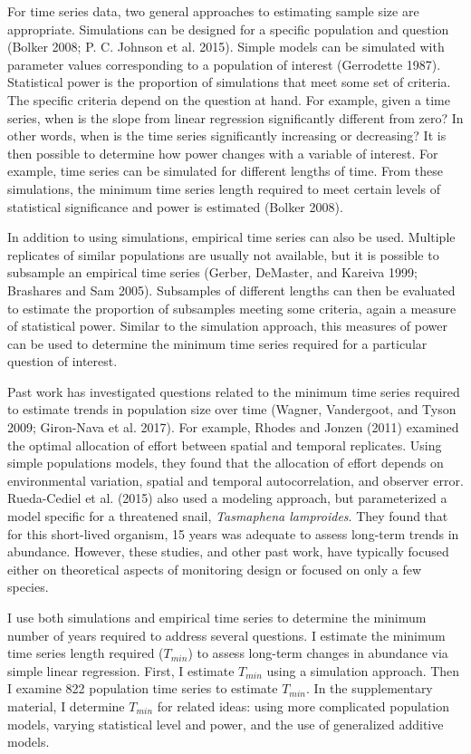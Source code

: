 \documentclass[12pt,]{article}
\begin{document}
\begin{spacing}{2}
For time series data, two general approaches to estimating sample size
are appropriate. Simulations can be designed for a specific population
and question (Bolker 2008; P. C. Johnson et al. 2015). Simple models can
be simulated with parameter values corresponding to a population of
interest (Gerrodette 1987). Statistical power is the proportion of
simulations that meet some set of criteria. The specific criteria depend
on the question at hand. For example, given a time series, when is the
slope from linear regression significantly different from zero? In other
words, when is the time series significantly increasing or decreasing?
It is then possible to determine how power changes with a variable of
interest. For example, time series can be simulated for different
lengths of time. From these simulations, the minimum time series length
required to meet certain levels of statistical significance and power is
estimated (Bolker 2008).

In addition to using simulations, empirical time series can also be
used. Multiple replicates of similar populations are usually not
available, but it is possible to subsample an empirical time series
(Gerber, DeMaster, and Kareiva 1999; Brashares and Sam 2005). Subsamples
of different lengths can then be evaluated to estimate the proportion of
subsamples meeting some criteria, again a measure of statistical power.
Similar to the simulation approach, this measures of power can be used
to determine the minimum time series required for a particular question
of interest.

Past work has investigated questions related to the minimum time series
required to estimate trends in population size over time (Wagner,
Vandergoot, and Tyson 2009; Giron-Nava et al. 2017). For example, Rhodes
and Jonzen (2011) examined the optimal allocation of effort between
spatial and temporal replicates. Using simple populations models, they
found that the allocation of effort depends on environmental variation,
spatial and temporal autocorrelation, and observer error. Rueda-Cediel
et al. (2015) also used a modeling approach, but parameterized a model
specific for a threatened snail, \emph{Tasmaphena lamproides}. They
found that for this short-lived organism, 15 years was adequate to
assess long-term trends in abundance. However, these studies, and other
past work, have typically focused either on theoretical aspects of
monitoring design or focused on only a few species.

I use both simulations and empirical time series to determine the
minimum number of years required to address several questions. I
estimate the minimum time series length required (\(T_{min}\)) to assess
long-term changes in abundance via simple linear regression. First, I
estimate \(T_{min}\) using a simulation approach. Then I examine 822
population time series to estimate \(T_{min}\). In the supplementary
material, I determine \(T_{min}\) for related ideas: using more
complicated population models, varying statistical level and power, and
the use of generalized additive models.


\end{spacing}
\end{document}
